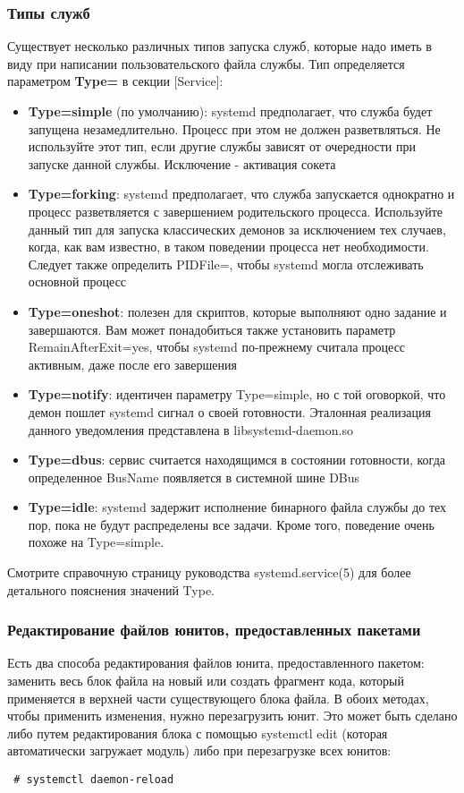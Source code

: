 \documentclass[a4paper,10pt,twoside]{article}
\begin{document}
\subsubsection{Типы служб}
Существует несколько различных типов запуска служб, которые надо иметь в виду при написании пользовательского файла службы. Тип определяется параметром \textbf{Type=} в секции [Service]:
\begin{itemize}
 \item \textbf{Type=simple} (по умолчанию): systemd предполагает, что служба будет запущена незамедлительно. Процесс при этом не должен разветвляться. Не используйте этот тип, если другие службы зависят от очередности при запуске данной службы. Исключение - активация сокета
\item \textbf{Type=forking}: systemd предполагает, что служба запускается однократно и процесс разветвляется с завершением родительского процесса. Используйте данный тип для запуска классических демонов за исключением тех случаев, когда, как вам известно, в таком поведении процесса нет необходимости. Следует также определить PIDFile=, чтобы systemd могла отслеживать основной процесс
\item \textbf{Type=oneshot}: полезен для скриптов, которые выполняют одно задание и завершаются. Вам может понадобиться также установить параметр RemainAfterExit=yes, чтобы systemd по-прежнему считала процесс активным, даже после его завершения
\item \textbf{Type=notify}: идентичен параметру Type=simple, но с той оговоркой, что демон пошлет systemd сигнал о своей готовности. Эталонная реализация данного уведомления представлена в libsystemd-daemon.so
\item \textbf{Type=dbus}: сервис считается находящимся в состоянии готовности, когда определенное BusName появляется в системной шине DBus
\item \textbf{Type=idle}: systemd задержит исполнение бинарного файла службы до тех пор, пока не будут распределены все задачи. Кроме того, поведение очень похоже на Type=simple.
\end{itemize}

Смотрите справочную страницу руководства systemd.service(5) для более детального пояснения значений Type.


\subsubsection{Редактирование файлов юнитов, предоставленных пакетами}
Есть два способа редактирования файлов юнита, предоставленного пакетом: заменить весь блок файла на новый или создать фрагмент кода, который применяется в верхней части существующего блока файла. В обоих методах, чтобы применить изменения, нужно перезагрузить юнит. Это может быть сделано либо путем редактирования блока с помощью systemctl edit (которая автоматически загружает модуль) либо при перезагрузке всех юнитов:
\begin{verbatim}
 # systemctl daemon-reload
\end{verbatim} 
\end{document}
